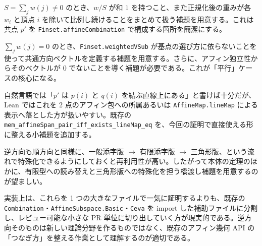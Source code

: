 \documentclass[a4paper,12pt]{bxjsbook}
\newlength{\customindent}
\newenvironment{body}{
  \par
  \begingroup
  \setlength{\leftskip}{\customindent}
  \setlength{\rightskip}{0pt}
  \setlength{\parindent}{1em}
  \setlength{\displayindent}{\customindent}
  \setlength{\displaywidth}{\dimexpr\linewidth-\customindent\relax}
}{
  \par
  \endgroup
}
\theoremstyle{theorem}
\begin{document}
    \begin{bodydescription}
        \item[\hspace*{1.5em}・重みの正規化に関する補題]
        $S=\sum_j w(j)\neq 0$ のとき、$w/S$ が和 $1$ を持つこと、また正規化後の重みが各 $w_i$ と頂点 $i$ を除いて比例し続けることをまとめて扱う補題を用意する。これは共点 $p'$ を \nolinkurl{Finset.affineCombination} で構成する箇所を簡潔にする。

        \item[\hspace*{1.5em}・零和重みから共通方向を作る補題]
        $\sum_j w(j)=0$ のとき、\nolinkurl{Finset.weightedVSub} が基点の選び方に依らないことを使って共通方向ベクトルを定義する補題を用意する。さらに、アフィン独立性からそのベクトルが $0$ でないことを導く補題が必要である。これが「平行」ケースの核心になる。

        \item[\hspace*{1.5em}・直線所属と \nolinkurl{lineMap} の往復補題]
        自然言語では「$p'$ は $p(i)$ と $q(i)$ を結ぶ直線上にある」と書けば十分だが、Lean ではこれを 2 点のアフィン包への所属あるいは \nolinkurl{AffineMap.lineMap} による表示へ落とした方が扱いやすい。既存の \nolinkurl{mem_affineSpan_pair_iff_exists_lineMap_eq} を、今回の証明で直接使える形に整える小補題を追加する。

        \item[\hspace*{1.5em}・特殊化のための橋渡し補題]
        逆方向も順方向と同様に、一般添字版 $\to$ 有限添字版 $\to$ 三角形版、という流れで特殊化できるようにしておくと再利用性が高い。したがって本体の定理のほかに、有限型への読み替えと三角形版への特殊化を担う橋渡し補題を用意するのが望ましい。
    \end{bodydescription}

    \begin{body}
        \indent 実装上は、これらを 1 つの大きなファイルで一気に証明するよりも、既存の \nolinkurl{Combination}・\nolinkurl{AffineSubspace.Basic}・\nolinkurl{Ceva} を import した補助ファイルに分割し、レビュー可能な小さな PR 単位に切り出していく方が現実的である。逆方向そのものは新しい理論分野を作るものではなく、既存のアフィン幾何 API の「つなぎ方」を整える作業として理解するのが適切である。
    \end{body}

\end{document}
